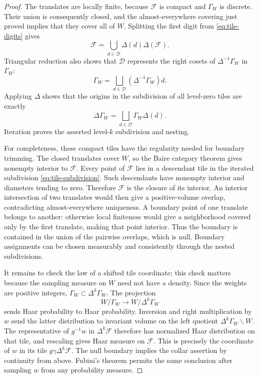 \begin{proof}
The translates are locally finite, because \(\mathcal F\) is
compact and \(\Gamma_W\) is discrete.  Their union is consequently
closed, and the almost-everywhere covering just proved implies
that they cover all of \(W\).  Splitting the first digit from
\eqref{eq:tile-digits} gives
\begin{equation}\label{eq:tile-subdivision}
          \mathcal F
             =\bigcup_{d\in\mathcal D}
                    \Delta(d)\Delta(\mathcal F).
\end{equation}
Triangular reduction also shows that \(\mathcal D\) represents the
right cosets of \(\Delta^{-1}\Gamma_W\) in \(\Gamma_W\):
\[
      \Gamma_W=
          \bigsqcup_{d\in\mathcal D}
                       (\Delta^{-1}\Gamma_W)d.
\]
Applying \(\Delta\) shows that the origins in the subdivision of
all level-zero tiles are exactly
\[
            \Delta\Gamma_W
                  =\bigsqcup_{d\in\mathcal D}\Gamma_W\Delta(d).
\]
Iteration proves the asserted level-\(k\) subdivision and nesting.

For completeness, these compact tiles have the regularity needed
for boundary trimming.  The closed translates cover \(W\), so the
Baire category theorem gives nonempty interior to \(\mathcal F\).
Every point of \(\mathcal F\) lies in a descendant tile in the
iterated subdivision \eqref{eq:tile-subdivision}.  Such descendants
have nonempty interior and diameters tending to zero.  Therefore
\(\mathcal F\) is the closure of its interior.  An interior
intersection of two translates would then give a positive-volume
overlap, contradicting almost-everywhere uniqueness.  A boundary
point of one translate belongs to another: otherwise local
finiteness would give a neighborhood covered only by the first
translate, making that point interior.  Thus the boundary is
contained in the union of the pairwise overlaps, which is null.
Boundary assignments can be chosen measurably and consistently
through the nested subdivisions.

It remains to check the law of a shifted tile coordinate; this
check matters because the sampling measure on \(W\) need not have
a density.  Since the weights are positive integers,
\(\Gamma_W\subset\Delta^k\Gamma_W\).
The projection
\[
                 W/\Gamma_W\longrightarrow W/\Delta^k\Gamma_W
\]
sends Haar probability to Haar probability.  Inversion and right
multiplication by \(w\) send the latter distribution to invariant
volume on the left quotient
\(\Delta^k\Gamma_W\backslash W\).
The representative of \(g^{-1}w\) in \(\Delta^k\mathcal F\)
therefore has normalized Haar distribution on that tile, and
rescaling gives Haar measure on \(\mathcal F\).
This is precisely the coordinate of \(w\) in its tile
\(g\gamma\Delta^k\mathcal F\).
The null boundary implies the collar assertion by continuity from
above.  Fubini's theorem permits the same conclusion after
sampling \(w\) from any probability measure.
\end{proof}

